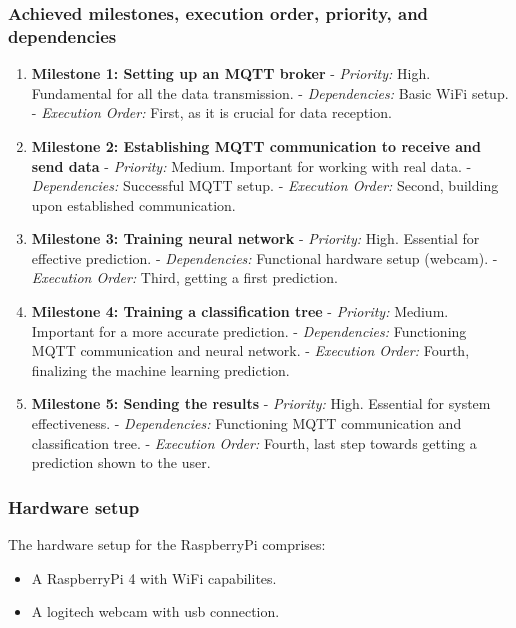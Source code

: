 \subsubsection{Achieved milestones, execution order, priority, and dependencies}
\begin{enumerate}
    \item \textbf{Milestone 1: Setting up an MQTT broker}
       - \textit{Priority:} High. Fundamental for all the data transmission.
       - \textit{Dependencies:} Basic WiFi setup.
       - \textit{Execution Order:} First, as it is crucial for data reception.

    \item \textbf{Milestone 2: Establishing MQTT communication to receive and send data}
       - \textit{Priority:} Medium. Important for working with real data.
       - \textit{Dependencies:} Successful MQTT setup.
       - \textit{Execution Order:} Second, building upon established communication.

    \item \textbf{Milestone 3: Training neural network}
       - \textit{Priority:} High. Essential for effective prediction.
       - \textit{Dependencies:} Functional hardware setup (webcam).
       - \textit{Execution Order:} Third, getting a first prediction.

    \item \textbf{Milestone 4: Training a classification tree}
       - \textit{Priority:} Medium. Important for a more accurate prediction.
       - \textit{Dependencies:} Functioning MQTT communication and neural network.
       - \textit{Execution Order:} Fourth, finalizing the machine learning prediction.

    \item \textbf{Milestone 5: Sending the results}
       - \textit{Priority:} High. Essential for system effectiveness.
       - \textit{Dependencies:} Functioning MQTT communication and classification tree.
       - \textit{Execution Order:} Fourth, last step towards getting a prediction shown to the user.
\end{enumerate}

\subsubsection{Hardware setup}
The hardware setup for the RaspberryPi comprises:
\begin{itemize}
    \item A RaspberryPi 4 with WiFi capabilites.
    \item A logitech webcam with usb connection.
\end{itemize}

